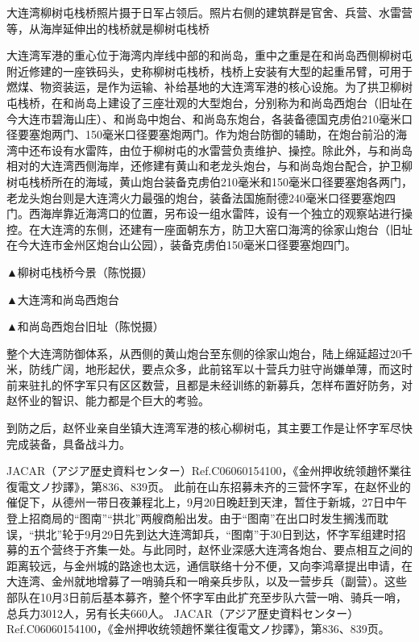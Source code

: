 \documentclass[12pt,UTF8]{ctexbook}
\begin{document}
大连湾柳树屯栈桥照片摄于日军占领后。照片右侧的建筑群是官舍、兵营、水雷营等，从海岸延伸出的栈桥就是柳树屯栈桥

大连湾军港的重心位于海湾内岸线中部的和尚岛，重中之重是在和尚岛西侧柳树屯附近修建的一座铁码头，史称柳树屯栈桥，栈桥上安装有大型的起重吊臂，可用于燃煤、物资装运，是作为运输、补给基地的大连湾军港的核心设施。为了拱卫柳树屯栈桥，在和尚岛上建设了三座壮观的大型炮台，分别称为和尚岛西炮台（旧址在今大连市碧海山庄）、和尚岛中炮台、和尚岛东炮台，各装备德国克虏伯210毫米口径要塞炮两门、150毫米口径要塞炮两门。作为炮台防御的辅助，在炮台前沿的海湾中还布设有水雷阵，由位于柳树屯的水雷营负责维护、操控。除此外，与和尚岛相对的大连湾西侧海岸，还修建有黄山和老龙头炮台，与和尚岛炮台配合，护卫柳树屯栈桥所在的海域，黄山炮台装备克虏伯210毫米和150毫米口径要塞炮各两门，老龙头炮台则是大连湾火力最强的炮台，装备法国施耐德240毫米口径要塞炮四门。西海岸靠近海湾口的位置，另布设一组水雷阵，设有一个独立的观察站进行操控。在大连湾的东侧，还建有一座面朝东方，防卫大窑口海湾的徐家山炮台（旧址在今大连市金州区炮台山公园），装备克虏伯150毫米口径要塞炮四门。


▲柳树屯栈桥今景（陈悦摄）


▲大连湾和尚岛西炮台


▲和尚岛西炮台旧址（陈悦摄）

整个大连湾防御体系，从西侧的黄山炮台至东侧的徐家山炮台，陆上绵延超过20千米，防线广阔，地形起伏，要点众多，此前铭军以十营兵力驻守尚嫌单薄，而这时前来驻扎的怀字军只有区区数营，且都是未经训练的新募兵，怎样布置好防务，对赵怀业的智识、能力都是个巨大的考验。

到防之后，赵怀业亲自坐镇大连湾军港的核心柳树屯，其主要工作是让怀字军尽快完成装备，具备战斗力。

JACAR（アジア歴史資料センター）Ref.C06060154100，《金州押收统领趙怀業往復電文ノ抄譯》，第836、839页。
此前在山东招募未齐的三营怀字军，在赵怀业的催促下，从德州一带日夜兼程北上，9月20日晚赶到天津，暂住于新城，27日中午登上招商局的“图南”“拱北”两艘商船出发。由于“图南”在出口时发生搁浅而耽误，“拱北”轮于9月29日先到达大连湾卸兵，“图南”于30日到达，怀字军组建时招募的五个营终于齐集一处。与此同时，赵怀业深感大连湾各炮台、要点相互之间的距离较远，与金州城的路途也太远，通信联络十分不便，又向李鸿章提出申请，在大连湾、金州就地增募了一哨骑兵和一哨亲兵步队，以及一营步兵（副营）。这些部队在10月3日前后基本募齐，整个怀字军由此扩充至步队六营一哨、骑兵一哨，总兵力3012人，另有长夫660人。 JACAR（アジア歴史資料センター）Ref.C06060154100，《金州押收统领趙怀業往復電文ノ抄譯》，第836、839页。
\end{document}
